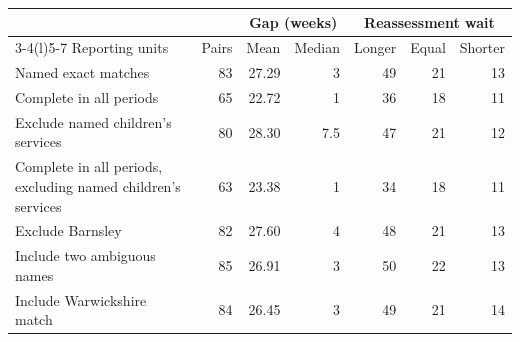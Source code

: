 \begin{tabularx}{\linewidth}{@{}Xrrrrrr@{}}\toprule
& & \multicolumn{2}{c}{Gap (weeks)} & \multicolumn{3}{c}{Reassessment wait}\\
\cmidrule(lr){3-4}\cmidrule(l){5-7}
Reporting units & Pairs & Mean & Median & Longer & Equal & Shorter\\\midrule
Named exact matches & 83 & 27.29 & 3 & 49 & 21 & 13\\
Complete in all periods & 65 & 22.72 & 1 & 36 & 18 & 11\\
Exclude named children's services & 80 & 28.30 & 7.5 & 47 & 21 & 12\\
Complete in all periods, excluding named children's services & 63 & 23.38 & 1 & 34 & 18 & 11\\
Exclude Barnsley & 82 & 27.60 & 4 & 48 & 21 & 13\\
Include two ambiguous names & 85 & 26.91 & 3 & 50 & 22 & 13\\
Include Warwickshire match & 84 & 26.45 & 3 & 49 & 21 & 14\\
\bottomrule
\end{tabularx}
